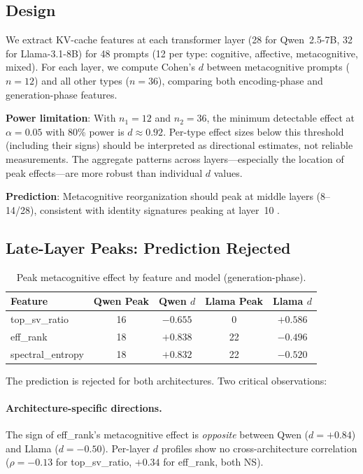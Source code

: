 \documentclass[11pt,a4paper]{article}
\begin{document}
\subsection{Design}

We extract KV-cache features at each transformer layer (28 for
Qwen~2.5-7B, 32 for Llama-3.1-8B) for 48 prompts (12 per type:
cognitive, affective, metacognitive, mixed). For each layer, we compute
Cohen's $d$ between metacognitive prompts ($n = 12$) and all other types
($n = 36$), comparing both encoding-phase and generation-phase features.

\textbf{Power limitation}: With $n_1 = 12$ and $n_2 = 36$, the minimum
detectable effect at $\alpha = 0.05$ with 80\% power is $d \approx 0.92$.
Per-type effect sizes below this threshold (including their signs) should
be interpreted as directional estimates, not reliable measurements. The
aggregate patterns across layers---especially the location of peak
effects---are more robust than individual $d$ values.

\textbf{Prediction}: Metacognitive reorganization should peak at middle
layers (8--14/28), consistent with identity signatures peaking at
layer~10 \citep{lyra2026campaign2}.

\subsection{Late-Layer Peaks: Prediction Rejected}

\begin{table}[H]
\centering
\caption{Peak metacognitive effect by feature and model (generation-phase).}
\label{tab:study1_peaks}
\begin{tabular}{lcccc}
\toprule
\textbf{Feature} & \textbf{Qwen Peak} & \textbf{Qwen $d$} & \textbf{Llama Peak} & \textbf{Llama $d$} \\
\midrule
top\_sv\_ratio    & 16 & $-0.655$ & 0  & $+0.586$ \\
eff\_rank         & 18 & $+0.838$ & 22 & $-0.496$ \\
spectral\_entropy & 18 & $+0.832$ & 22 & $-0.520$ \\
\bottomrule
\end{tabular}
\end{table}

The prediction is rejected for both architectures. Two critical
observations:

\paragraph{Architecture-specific directions.} The sign of eff\_rank's
metacognitive effect is \emph{opposite} between Qwen ($d = +0.84$) and
Llama ($d = -0.50$). Per-layer $d$ profiles show no cross-architecture
correlation ($\rho = -0.13$ for top\_sv\_ratio, $+0.34$ for eff\_rank,
both NS).
\end{document}

